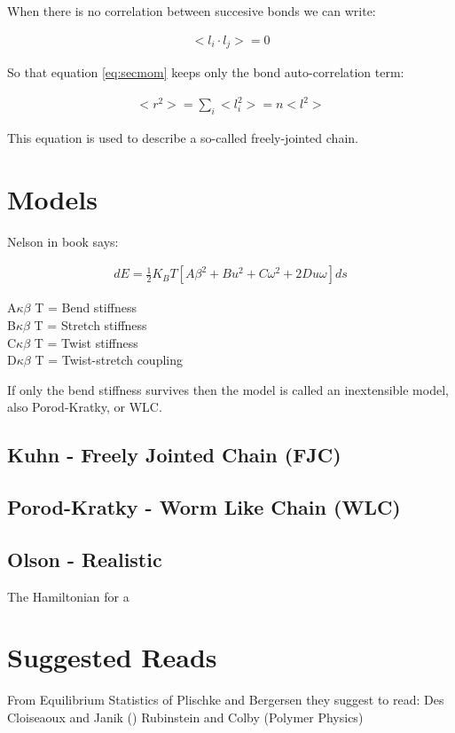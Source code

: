 When there is no correlation between succesive bonds we can write:

\begin{gather}
\label{eq:nocorr}
<l_{i} \cdot l_{j}> = 0
\end{gather}

So that equation \ref{eq:secmom} keeps only the bond auto-correlation term:

\begin{gather}
<r^2> = \sum_{i}<l_{i}^2> = n<l^2>
\end{gather}  

This equation is used to describe a so-called freely-jointed chain.





\section{Models}

Nelson in book says:

\begin{gather}
dE=\frac{1}{2} K_{B}T [A\beta^2+Bu^2+C\omega^2+2Du\omega] ds
\end{gather}  

A$\kappa \beta$ T = Bend stiffness\\
B$\kappa \beta$ T = Stretch stiffness\\
C$\kappa \beta$ T = Twist stiffness\\
D$\kappa \beta$ T = Twist-stretch coupling

If only the bend stiffness survives then the model is called an
inextensible model, also Porod-Kratky, or WLC.

\subsection{Kuhn - Freely Jointed Chain (FJC)}

\subsection{Porod-Kratky - Worm Like Chain (WLC)}

\subsection{Olson - Realistic}

The Hamiltonian for a \cite{czapla2009}





\section{Suggested Reads}

From Equilibrium Statistics of Plischke and Bergersen they suggest to
read:
Des Cloiseaoux and Janik ()
Rubinstein and Colby (Polymer Physics)

